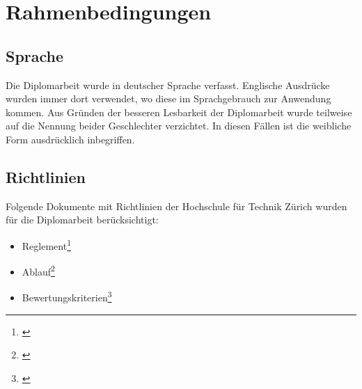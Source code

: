 \section{Rahmenbedingungen}

\subsection{Sprache}
Die Diplomarbeit wurde in deutscher Sprache verfasst. Englische Ausdrücke 
wurden immer dort verwendet, wo diese im Sprachgebrauch zur Anwendung kommen.
Aus Gründen der besseren Lesbarkeit der Diplomarbeit wurde teilweise auf 
die Nennung beider Geschlechter verzichtet. In diesen Fällen ist die 
weibliche Form ausdrücklich inbegriffen.
  
\subsection{Richtlinien}
Folgende Dokumente mit Richtlinien der Hochschule für Technik Zürich 
wurden für die Diplomarbeit berücksichtigt:

\begin{itemize}
    \item Reglement\footnote{\citealp*[Vgl.][ganzes Dokument]{hsz_reglement}}
    \item Ablauf\footnote{\citealp*[Vgl.][ganzes Dokument]{hsz_ablauf}}
    \item Bewertungskriterien\footnote{\citealp*[Vgl.][ganzes Dokument]{hsz_bewertungskriterien}}
\end{itemize}

